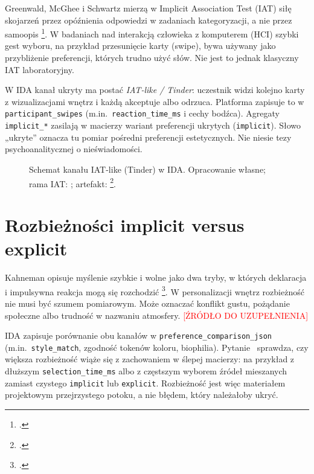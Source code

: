 Greenwald, McGhee i Schwartz mierzą w Implicit Association Test (IAT) siłę skojarzeń przez opóźnienia odpowiedzi w zadaniach kategoryzacji, a nie przez samoopis \footcite{greenwald1998iat}.
W badaniach nad interakcją człowieka z komputerem (HCI) szybki gest wyboru, na przykład przesunięcie karty (swipe), bywa używany jako przybliżenie preferencji, których trudno użyć słów. Nie jest to jednak klasyczny IAT laboratoryjny.

W IDA kanał ukryty ma postać \emph{IAT-like / Tinder}: uczestnik widzi kolejno karty z wizualizacjami wnętrz i każdą akceptuje albo odrzuca. Platforma zapisuje to w \texttt{participant\_swipes} (m.in.\ \texttt{reaction\_time\_ms} i cechy bodźca).
Agregaty \texttt{implicit\_*} zasilają w macierzy wariant preferencji ukrytych (\texttt{implicit}).
Słowo „ukryte” oznacza tu pomiar pośredni preferencji estetycznych. Nie niesie tezy psychoanalitycznej o nieświadomości.

\begin{figure}[htbp]
  \centering
  \caption{Schemat kanału IAT-like (Tinder) w IDA.
    Opracowanie własne; rama IAT: \textcite{greenwald1998iat}; artefakt: \footcite{idaPlatform2026}.}
  \label{fig:ch03:tinder-iat}
\end{figure}

\section{Rozbieżności implicit versus explicit}
\label{ch03:sec:rozbieznosci}

Kahneman opisuje myślenie szybkie i wolne jako dwa tryby, w których deklaracja i impulsywna reakcja mogą się rozchodzić \footcite{kahneman2011thinking}.
W personalizacji wnętrz rozbieżność nie musi być szumem pomiarowym. Może oznaczać konflikt gustu, pożądanie społeczne albo trudność w nazwaniu atmosfery. \textcolor{red}{[ŹRÓDŁO DO UZUPEŁNIENIA]}

IDA zapisuje porównanie obu kanałów w \texttt{preference\_comparison\_json} (m.in.\ \texttt{style\_match}, zgodność tokenów koloru, biophilia).
Pytanie~ sprawdza, czy większa rozbieżność wiąże się z zachowaniem w ślepej macierzy: na przykład z dłuższym \texttt{selection\_time\_ms} albo z częstszym wyborem źródeł mieszanych zamiast czystego \texttt{implicit} lub \texttt{explicit}.
Rozbieżność jest więc materiałem projektowym przejrzystego potoku, a nie błędem, który należałoby ukryć.

